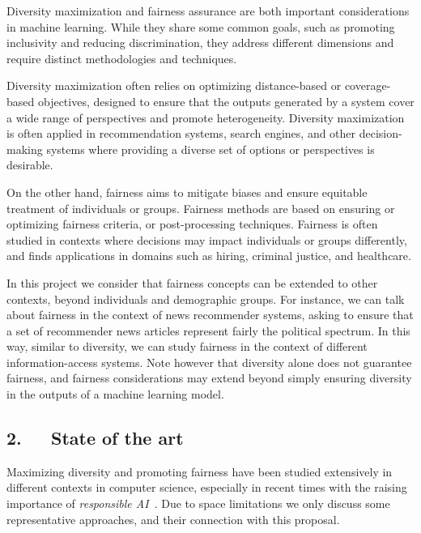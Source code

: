 \documentclass[a4paper,11pt]{article}
\begin{document}
Diversity maximization and fairness assurance are both important considerations in machine learning.
While they share some common goals, such as promoting inclusivity and reducing discrimination, 
they address different dimensions and require distinct methodologies and techniques. 

Diversity maximization often relies on optimizing distance-based or coverage-based objectives, 
designed to ensure that the outputs generated by a system cover a wide range of perspectives
and promote heterogeneity. 
Diversity maximization is often applied in recommendation systems, search engines, 
and other decision-making systems where providing a diverse set of options or perspectives is desirable.

On the other hand, 
fairness aims to mitigate biases and ensure equitable treatment of individuals or groups.
Fairness methods are based on ensuring or optimizing fairness criteria, or post-processing techniques. 
Fairness is often studied in contexts where decisions may impact individuals or groups differently, 
and finds applications in domains such as hiring, criminal justice, and healthcare.

In this project we consider that fairness concepts can be extended to other contexts,  
beyond individuals and demographic groups. 
For instance, we can talk about fairness in the context of news recommender systems, 
asking to ensure that a set of recommender news articles represent fairly the political spectrum.
In this way, similar to diversity, we can study fairness in the context of different information-access systems. 
Note however that diversity alone does not guarantee fairness, 
and fairness considerations may extend beyond simply ensuring diversity 
in the outputs of a machine learning model.

\subsection*{2.~~~State of the art}

Maximizing diversity and promoting fairness have been studied 
extensively in different contexts in computer science, 
especially in recent times with the raising importance of \emph{responsible AI}~\cite{dignum2019responsible}.
Due to space limitations we only discuss some representative approaches, 
and their connection with this proposal.

\end{document}
